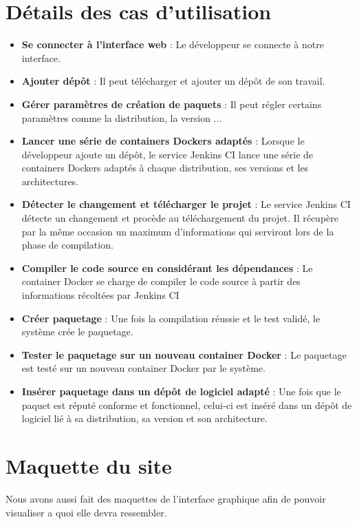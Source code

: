 \documentclass[12pt,a4paper]{article}
\begin{document}
\section{Détails des cas d'utilisation}
	\begin{itemize}\renewcommand{\labelitemi}{$\bullet$}
		\item\textbf{ \og Se connecter à l'interface web \fg{}} : Le développeur se connecte à notre interface. 
		\item \textbf{ \og Ajouter dépôt \fg{}} : Il peut télécharger et ajouter un dépôt de son travail.
		\item \textbf{ \og Gérer paramètres de création de paquets \fg{}} : Il peut régler certains paramètres comme la distribution, la version ...
		\item \textbf{ \og Lancer une série de containers Dockers adaptés \fg{}} : Lorsque le développeur ajoute un dépôt, le service Jenkins CI lance une série de containers Dockers adaptés à chaque distribution, ses versions et les architectures.
		\item \textbf{ \og Détecter le changement et télécharger le projet \fg{}} : Le service Jenkins CI détecte un changement et procède au téléchargement du projet. Il récupère par la même occasion un maximum d'informations qui serviront lors de la phase de compilation.
		\item \textbf{ \og Compiler le code source en considérant les dépendances \fg{}} : Le container Docker se charge de compiler le code source à partir des informations récoltées par Jenkins CI 
		\item \textbf{ \og Créer paquetage \fg{}} : Une fois la compilation réussie et le test validé, le système crée le paquetage.
		\item \textbf{ \og Tester le paquetage sur un nouveau container Docker \fg{}}: Le paquetage est testé sur un nouveau container Docker par le système.
		\item \textbf{ \og Insérer paquetage dans un dépôt de logiciel adapté \fg{}} : Une fois que le paquet est réputé conforme et fonctionnel, celui-ci est inséré dans un dépôt de logiciel lié à sa distribution, sa version et son architecture.
	\end{itemize}

\section{Maquette du site}
	Nous avons aussi fait des maquettes de l'interface graphique afin de pouvoir visualiser a quoi elle devra ressembler.
\end{document}
